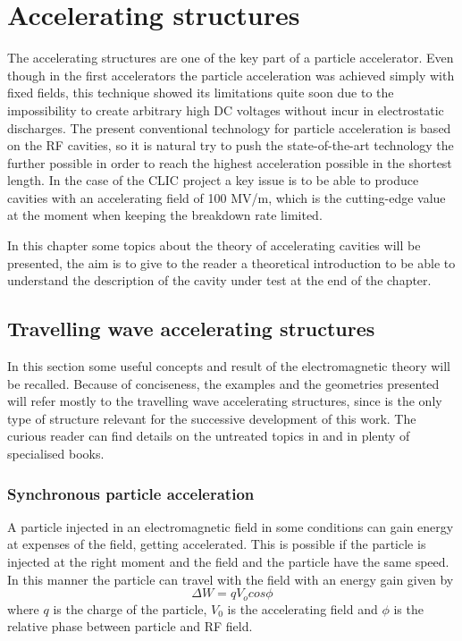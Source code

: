 

\chapter[Accelerating structures]{Accelerating structures}

The accelerating structures are one of the key part of a particle accelerator. Even though in the first accelerators the particle acceleration was achieved simply with fixed fields, this technique showed its limitations quite soon due to the impossibility to create arbitrary high DC voltages without incur in electrostatic discharges. The present conventional technology for particle acceleration is based on the RF cavities, so it is natural try to push the state-of-the-art technology the further possible in order to reach the highest acceleration possible in the shortest length. In the case of the CLIC project a key issue is to be able to produce cavities with an accelerating field of 100 MV/m, which is the cutting-edge value at the moment when keeping the breakdown rate limited.

In this chapter some topics about the theory of accelerating cavities will be presented, the aim is to give to the reader a theoretical introduction to be able to understand the description of the cavity under test at the end of the chapter.

\section[Travelling wave accelerating structures]{Travelling wave accelerating structures}

In this section some useful concepts and result of the electromagnetic theory will be recalled. Because of conciseness, the examples and the geometries presented will refer mostly to the travelling wave accelerating structures, since is the only type of structure relevant for the successive development of this work. The curious reader can find details on the untreated topics in \cite{Weiss:261732,Wangler:RF_LINAC,Humphries:107756} and in plenty of specialised books.

\subsection[Synchronous particle acceleration]{Synchronous particle acceleration}

A particle injected in an electromagnetic field in some conditions can gain energy at expenses of the field, getting accelerated. This is possible if the particle is injected at the right moment and the field and the particle have the same speed. In this manner the particle can travel with the field with an energy gain given by
\begin{equation}
\Delta W = q V_o cos \phi
\end{equation}
where $q$ is the charge of the particle, $V_0$ is the accelerating field and $\phi$ is the relative phase between particle and RF field.

